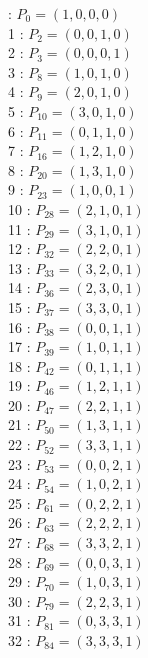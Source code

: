 \documentclass{article}
\begin{document}
{\begin{multicols}{3}
 : $P_{0}=( 1, 0, 0, 0 )$\\
1 : $P_{2}=( 0, 0, 1, 0 )$\\
2 : $P_{3}=( 0, 0, 0, 1 )$\\
3 : $P_{8}=( 1, 0, 1, 0 )$\\
4 : $P_{9}=( 2, 0, 1, 0 )$\\
5 : $P_{10}=( 3, 0, 1, 0 )$\\
6 : $P_{11}=( 0, 1, 1, 0 )$\\
7 : $P_{16}=( 1, 2, 1, 0 )$\\
8 : $P_{20}=( 1, 3, 1, 0 )$\\
9 : $P_{23}=( 1, 0, 0, 1 )$\\
10 : $P_{28}=( 2, 1, 0, 1 )$\\
11 : $P_{29}=( 3, 1, 0, 1 )$\\
12 : $P_{32}=( 2, 2, 0, 1 )$\\
13 : $P_{33}=( 3, 2, 0, 1 )$\\
14 : $P_{36}=( 2, 3, 0, 1 )$\\
15 : $P_{37}=( 3, 3, 0, 1 )$\\
16 : $P_{38}=( 0, 0, 1, 1 )$\\
17 : $P_{39}=( 1, 0, 1, 1 )$\\
18 : $P_{42}=( 0, 1, 1, 1 )$\\
19 : $P_{46}=( 1, 2, 1, 1 )$\\
20 : $P_{47}=( 2, 2, 1, 1 )$\\
21 : $P_{50}=( 1, 3, 1, 1 )$\\
22 : $P_{52}=( 3, 3, 1, 1 )$\\
23 : $P_{53}=( 0, 0, 2, 1 )$\\
24 : $P_{54}=( 1, 0, 2, 1 )$\\
25 : $P_{61}=( 0, 2, 2, 1 )$\\
26 : $P_{63}=( 2, 2, 2, 1 )$\\
27 : $P_{68}=( 3, 3, 2, 1 )$\\
28 : $P_{69}=( 0, 0, 3, 1 )$\\
29 : $P_{70}=( 1, 0, 3, 1 )$\\
30 : $P_{79}=( 2, 2, 3, 1 )$\\
31 : $P_{81}=( 0, 3, 3, 1 )$\\
32 : $P_{84}=( 3, 3, 3, 1 )$\\
\end{multicols}


%


%


}%
\end{document}
